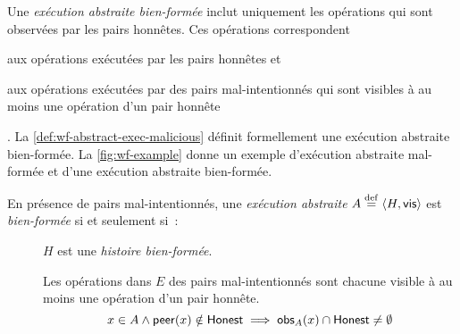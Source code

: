 Une \emph{exécution abstraite bien-formée} inclut uniquement les opérations qui sont observées par les pairs honnêtes.
Ces opérations correspondent \begin{inlinelist}
    \item aux opérations exécutées par les pairs honnêtes et
    \item aux opérations exécutées par des pairs mal-intentionnés qui sont visibles à au moins une opération d'un pair honnête
\end{inlinelist}.
La \autoref{def:wf-abstract-exec-malicious} définit formellement une exécution abstraite bien-formée.
La \autoref{fig:wf-example} donne un exemple d'exécution abstraite mal-formée et d'une exécution abstraite bien-formée.

\begin{definition}\label{def:wf-abstract-exec-malicious}
    En présence de pairs mal-intentionnés, une \emph{exécution abstraite} $A \defeq \tuple*{H, \trm{vis}}$ est \emph{bien-formée} si et seulement si~:
    \begin{description}
      \item[] $H$ est une \emph{histoire bien-formée}.
    
      \item[] Les opérations dans $E$ des pairs mal-intentionnés sont chacune visible à au moins une opération d'un pair honnête.
      \begin{equation*}
        x \in A \land \trm{peer}(x) \notin \trm{Honest} \implies \trm{obs}_A(x) \cap \trm{Honest} \neq \emptyset
      \end{equation*}
    \end{description}
\end{definition}

